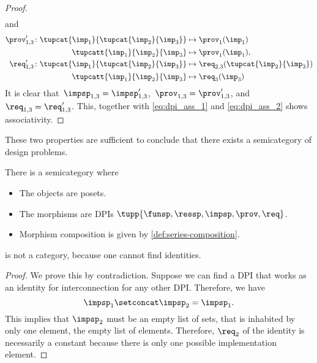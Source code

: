 \begin{proof}
\begin{equation}
\begin{aligned}
		\end{aligned}
	\end{equation}
	and
	\begin{equation}
		\begin{aligned}
			\prov'_{1,3} \colon  \tupcat {\imp_{1}}{\tupcat {\imp_{2}} {\imp_{3}}} & \mapsto\prov_{1}(\imp_{1})                       \\
			\tupcatt{\imp_{1}}{\imp_{2}}{\imp_{3}}                                 & \mapsto\prov_{1}(\imp_{1}),                      \\
			\req'_{1,3} \colon  \tupcat {\imp_{1}}{\tupcat {\imp_{2}} {\imp_{3}}}  & \mapsto\req_{2,3}(\tupcat {\imp_{2}} {\imp_{3}}) \\
			\tupcatt{\imp_{1}}{\imp_{2}}{\imp_{3}}                                 & \mapsto \req_{3}(\imp_{3})
		\end{aligned}
	\end{equation}
	It is clear that~$\impsp_{1,3}=\impsp'_{1,3}$,~$\prov_{1,3}=\prov'_{1,3}$, and~$\req_{1,3}=\req'_{1,3}$.
	This, together with \cref{eq:dpi_ass_1} and \cref{eq:dpi_ass_2} shows associativity.
\end{proof}

These two properties are sufficient to conclude that there exists a semicategory of design problems.

\begin{definition}
	\label{def:DPIcat}
	There is a semicategory \DPI where
	\begin{itemize}
		\item The objects are posets.
		\item The morphisms are DPIs $\tupp{\funsp,\ressp,\impsp,\prov,\req}$.
		\item Morphism composition is given by \cref{def:series-composition}.
	\end{itemize}
\end{definition}

\begin{lemma}
	\DPI is not a category, because one cannot find identities.
\end{lemma}
\begin{proof}
	We prove this by contradiction.
	Suppose we can find a DPI that works as an identity for interconnection for any other DPI.
	Therefore, we have
	\begin{equation}
		\impsp_{1} \setconcat \impsp_{2} = \impsp_{1}.
	\end{equation}
	This implies that $\impsp_{2}$ must be an empty list of sets,  that is inhabited by only one element, the empty list of elements.
	Therefore, $\req_2$ of the identity is necessarily a constant because there is only one possible implementation element.
\end{proof}

